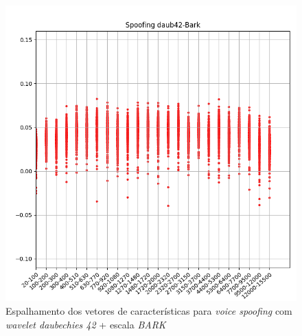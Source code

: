 		\begin{figure}
			\centering
			\includegraphics[width=\linewidth]{images/results/barkVersusMel/spoofingDaub42Bark}
			\caption{Espalhamento dos vetores de características para \textit{voice spoofing} com \textit{wavelet daubechies 42} + escala \textit{BARK} }
			\label{fig:spoofingdaub42bark}
		\end{figure}
		
